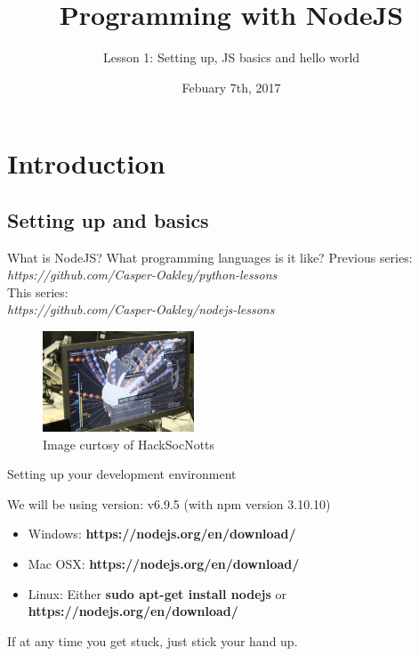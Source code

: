 \documentclass{beamer}
\title{Programming with NodeJS}
\subtitle{Lesson 1: Setting up, JS basics and hello world}
\date{Febuary 7th, 2017}
\begin{document}
\begin{frame}
  \titlepage
\end{frame}


\section{Introduction}

\subsection{Setting up and basics}

\begin{frame}{What is NodeJS? What programming languages is it like?}
\pause
Previous series:\\
\pause
\textit{https://github.com/Casper-Oakley/python-lessons}\\
\pause
This series:\\
\pause
\textit{https://github.com/Casper-Oakley/nodejs-lessons}
\pause
\begin{figure}[h]
\includegraphics[width=0.4\textwidth]{wow}
\caption{Image curtosy of HackSocNotts}
\end{figure}
\end{frame}

\begin{frame}{Setting up your development environment}

We will be using  version: v6.9.5 (with npm version 3.10.10)

\begin{itemize}
  \item {
    Windows: \textbf{https://nodejs.org/en/download/}
  }
  \item {
    Mac OSX: \textbf{https://nodejs.org/en/download/}
  }
  \item {
    Linux: Either \textbf{sudo apt-get install nodejs} or \textbf{https://nodejs.org/en/download/}
  }
\end{itemize}

If at any time you get stuck, just stick your hand up.

\end{frame}
\end{document}

